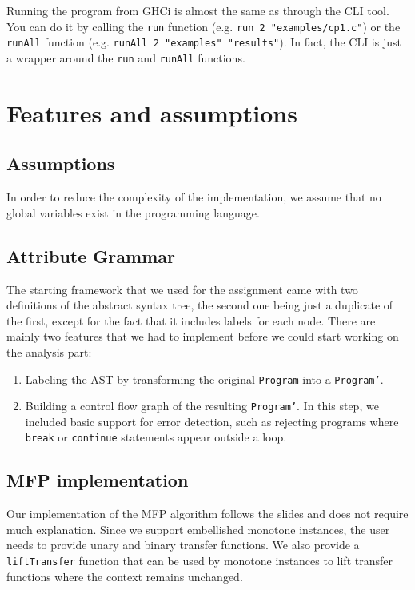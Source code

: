 \documentclass{article}
\begin{document}
Running the program from GHCi is almost the same as through the CLI tool. You can do it by calling the \texttt{run} function (e.g. \texttt{run 2 "examples/cp1.c"}) or the \texttt{runAll} function (e.g. \texttt{runAll 2 "examples" "results"}). In fact, the CLI is just a wrapper around the \texttt{run} and \texttt{runAll} functions.

\section{Features and assumptions}


\subsection*{Assumptions}

In order to reduce the complexity of the implementation, we assume that no global variables exist in the programming language.

\subsection*{Attribute Grammar}

The starting framework that we used for the assignment came with two definitions of the abstract syntax tree, the second one being just a duplicate of the first, except for the fact that it includes labels for each node. There are mainly two features that we had to implement before we could start working on the analysis part:

\begin{enumerate}
	\item Labeling the AST by transforming the original \texttt{Program} into a \texttt{Program'}.
	\item Building a control flow graph of the resulting \texttt{Program'}. In this step, we included basic support for error detection, such as rejecting programs where \texttt{break} or \texttt{continue} statements appear outside a loop.
\end{enumerate}

\subsection*{MFP implementation}

Our implementation of the MFP algorithm follows the slides and does not require much explanation. Since we support embellished monotone instances, the user needs to provide unary and binary transfer functions. We also provide a \texttt{liftTransfer} function that can be used by monotone instances to lift transfer functions where the context remains unchanged.
\end{document}

